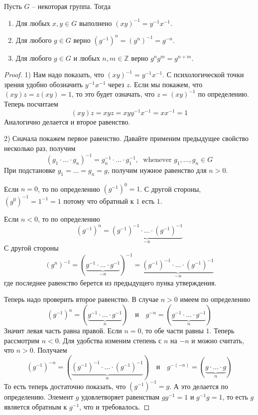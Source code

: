 \begin{claim}
Пусть $G$ -- некоторая группа.
Тогда
\begin{enumerate}
\item Для любых $x,y\in G$ выполнено $(xy)^{-1} = y^{-1}x^{-1}$.

\item Для любого $g\in G$ верно $(g^{-1})^n = (g^n)^{-1} = g^{-n}$.

\item Для любого $g\in G$ и любых $n,m\in \mathbb Z$ верно $g^n g^m = g^{n+m}$.
\end{enumerate}
\end{claim}
\begin{proof}
1) Нам надо показать, что $(xy)^{-1} = y^{-1}x^{-1}$.
С психологической точки зрения удобно обозначить $ y^{-1}x^{-1}$ через $z$.
Если мы покажем, что $(xy)z = z(xy) = 1$, то это будет означать, что $z = (xy)^{-1}$ по определению.
Теперь посчитаем
\[
(xy) z = xy z = xy y^{-1}x^{-1} = x x^{-1} = 1
\]
Аналогично делается и второе равенство.

2) Сначала покажем первое равенство.
Давайте применим предыдущее свойство несколько раз, получим
\[
(g_1\cdot \ldots \cdot g_n)^{-1} = g_n^{-1}\cdot\ldots\cdot g_1^{-1},\;\text{ whenever }g_1,\ldots,g_n\in G
\]
При подстановке $g_1 =\ldots = g_n = g$, получим нужное равенство для $n > 0$.

Если $n = 0$, то по определению $(g^{-1})^0 = 1$.
С другой стороны, $(g^0)^{-1} = 1^{-1} = 1$ потому что обратный к $1$ есть $1$.

Если $n < 0$, то по определению
\[
(g^{-1})^n = \underbrace{(g^{-1})^{-1}\cdot\ldots \cdot (g^{-1})^{-1}}_{-n}
\]
С другой стороны
\[
(g^n)^{-1} = (\underbrace{g^{-1}\cdot \ldots \cdot g^{-1}}_{-n})^{-1} = \underbrace{(g^{-1})^{-1}\cdot\ldots \cdot (g^{-1})^{-1}}_{-n}
\]
где последнее равенство берется из предыдущего пунка утверждения.

Теперь надо проверить второе равенство.
В случае $n > 0$ имеем по определению
\[
(g^{-1})^{n} =  (\underbrace{g^{-1}\cdot \ldots \cdot g^{-1}}_{n})\quad \text{и}\quad
g^{-n} =  (\underbrace{g^{-1}\cdot \ldots \cdot g^{-1}}_{n})
\]
Значит левая часть равна правой.
Если $n = 0$, то обе части равны $1$.
Теперь рассмотрим $n < 0$.
Для удобства изменим степень с $n$ на $-n$ и можно считать, что $n > 0$.
Получаем
\[
(g^{-1})^{-n} =  (\underbrace{(g^{-1})^{-1}\cdot \ldots \cdot (g^{-1})^{-1}}_{n})\quad \text{и}\quad
g^{-(-n)} =  (\underbrace{g\cdot \ldots \cdot g}_{n})
\]
То есть теперь достаточно показать, что $(g^{-1})^{-1} = g$.
А это делается по определению.
Элемент $g$ удовлетворяет равенствам $g g^{-1} = 1$ и $g^{-1} g = 1$, то есть $g$ является обратным к $g^{-1}$, что и требовалось.


\end{proof}
